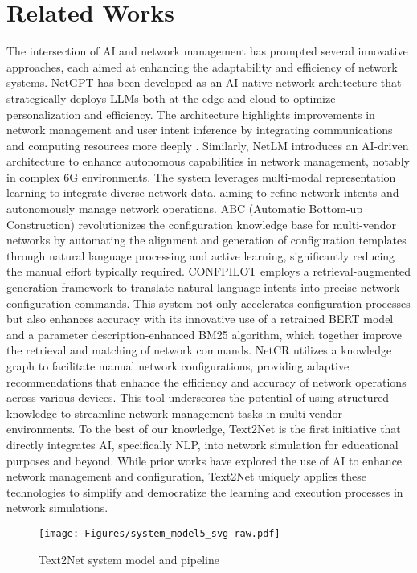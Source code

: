 \section{Related Works}
The intersection of AI and network management has prompted several innovative approaches, each aimed at enhancing the adaptability and efficiency of network systems. 
NetGPT \cite{chen2024netgpt} has been developed as an AI-native network architecture that strategically deploys LLMs both at the edge and cloud to optimize personalization and efficiency. The architecture highlights improvements in network management and user intent inference by integrating communications and computing resources more deeply \cite{tong2023ten}. Similarly, NetLM \cite{wang2023network} introduces an AI-driven architecture to enhance autonomous capabilities in network management, notably in complex 6G environments. The system leverages multi-modal representation learning to integrate diverse network data, aiming to refine network intents and autonomously manage network operations.
ABC (Automatic Bottom-up Construction) \cite{ding2023abc} revolutionizes the configuration knowledge base for multi-vendor networks by automating the alignment and generation of configuration templates through natural language processing and active learning, significantly reducing the manual effort typically required.
CONFPILOT \cite{zhao2023confpilot} employs a retrieval-augmented generation framework to translate natural language intents into precise network configuration commands. This system not only accelerates configuration processes but also enhances accuracy with its innovative use of a retrained BERT model and a parameter description-enhanced BM25 algorithm, which together improve the retrieval and matching of network commands.
NetCR \cite{guo2023netcr} utilizes a knowledge graph to facilitate manual network configurations, providing adaptive recommendations that enhance the efficiency and accuracy of network operations across various devices. This tool underscores the potential of using structured knowledge to streamline network management tasks in multi-vendor environments. To the best of our knowledge, Text2Net is the first initiative that directly integrates AI, specifically NLP, into network simulation for educational purposes and beyond. While prior works have explored the use of AI to enhance network management and configuration, Text2Net uniquely applies these technologies to simplify and democratize the learning and execution processes in network simulations. 
\begin{figure}[t!]
    \centering
    \texttt{[image: Figures/system\_model5\_svg-raw.pdf]}
    \caption{Text2Net system model and pipeline}
    \vspace{-4mm}
    \label{fig: system model}
\end{figure}